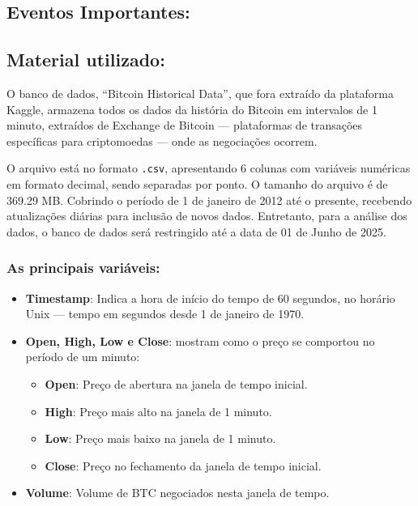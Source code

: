 \subsection{\textbf{Eventos Importantes:}}



\subsection{\textbf{Material utilizado:}}

O banco de dados, “Bitcoin Historical Data”, que fora extraído da plataforma Kaggle, armazena todos os dados da história do Bitcoin em intervalos de 1 minuto, extraídos de Exchange de Bitcoin — plataformas de transações específicas para criptomoedas — onde as negociações ocorrem.	

O arquivo está no formato \texttt{.csv}, apresentando 6 colunas com variáveis numéricas em formato decimal, sendo separadas por ponto. O tamanho do arquivo é de 369.29 MB. Cobrindo o período de 1 de janeiro de 2012 até o presente, recebendo atualizações diárias para inclusão de novos dados. Entretanto, para a análise dos dados, o banco de dados será restringido até a  data de 01 de Junho de 2025.

\subsubsection{\textbf{As principais variáveis:}}

\begin{itemize}
    \item \textbf{Timestamp}: Indica a hora de início do tempo de 60 segundos, no horário Unix — tempo em segundos desde 1 de janeiro de 1970.
    \item \textbf{Open, High, Low e Close}: mostram como o preço se comportou no período de um minuto:
    \begin{itemize}
        \item \textbf{Open}: Preço de abertura na janela de tempo inicial.
        \item \textbf{High}: Preço mais alto na janela de 1 minuto.
        \item \textbf{Low}: Preço mais baixo na janela de 1 minuto.
        \item \textbf{Close}: Preço no fechamento da janela de tempo inicial.
    \end{itemize}
    \item \textbf{Volume}: Volume de BTC negociados nesta janela de tempo.
\end{itemize}

